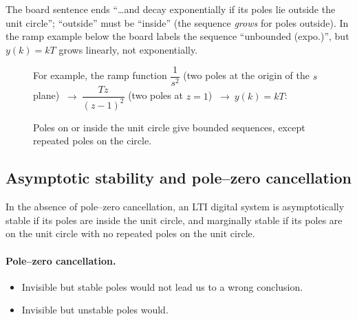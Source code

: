\begin{boardnote}
The board sentence ends ``\dots and decay exponentially if its poles lie outside the unit circle''; ``outside''
must be ``inside'' (the sequence \emph{grows} for poles outside). In the ramp example below the board
labels the sequence ``unbounded (expo.)'', but $y(k)=kT$ grows linearly, not exponentially.
\end{boardnote}

\begin{figure}[ht]
\centering
\begin{minipage}{0.4\linewidth}\centering\resizebox{\linewidth}{!}{\figPoleCircle}\end{minipage}\hfill
\begin{minipage}{0.55\linewidth}\centering
For example, the ramp function $\dfrac{1}{s^{2}}$ (two poles at the origin of the $s$ plane)
$\ \to\ \dfrac{Tz}{(z-1)^{2}}$ (two poles at $z=1$) $\ \to\ y(k)=kT$:\\[2mm]
\figRampSeq
\end{minipage}
\caption{Poles on or inside the unit circle give bounded sequences, except repeated poles on the circle.}
\end{figure}

\subsection{Asymptotic stability and pole--zero cancellation}
\begin{theorem}
In the absence of pole--zero cancellation, an LTI digital system is asymptotically stable if its poles are
inside the unit circle, and marginally stable if its poles are on the unit circle with no repeated poles on
the unit circle.
\end{theorem}

\paragraph{Pole--zero cancellation.}
\begin{itemize}
  \item Invisible but stable poles would not lead us to a wrong conclusion.
  \item Invisible but unstable poles would.
\end{itemize}

